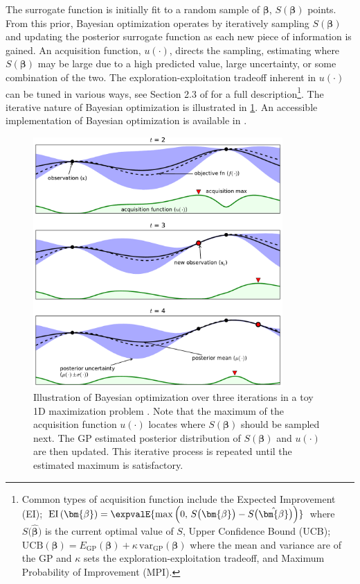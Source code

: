 The surrogate function is initially fit to
a random sample of $\bm{\beta}$, $S\left(\bm{\beta}\right)$ points.
From this prior, Bayesian optimization
operates by iteratively sampling $S\left(\bm{\beta}\right)$ and updating
the posterior surrogate function as each new piece of information is gained.
An acquisition function, $u\left(\cdot\right)$, directs the sampling,
estimating where $S\left(\bm{\beta}\right)$ may be large
due to a high predicted value, large uncertainty, or some combination of the two.
The exploration-exploitation tradeoff inherent in $u\left(\cdot\right)$
can be tuned in various ways, see Section 2.3 of \cite{Brochu2010} for a full description\footnote{Common types of acquisition function include the
Expected Improvement (EI);
$\text{EI}\left(\bm{\beta}\right) = \expvalE{\max\left(0,\,S\big(\bm{\beta}\big) - S\big(\hat{\bm{\beta}}\big)\right)}$
where $S\big(\hat{\bm{\beta}}\big)$ is the current optimal value of $S$,
Upper Confidence Bound (UCB);
$\text{UCB}\left(\bm{\beta}\right) = E_{\text{GP}} \left(\bm{\beta}\right) + \kappa\,\text{var}_{\text{GP}} \left(\bm{\beta}\right)$ where the mean and variance are of the GP and $\kappa$ sets the exploration-exploitation tradeoff,
and Maximum Probability of Improvement (MPI).}.
The iterative nature of Bayesian optimization is illustrated in \cref{fig:additional:unsupervised:BO:BO_ex}.
An accessible implementation of Bayesian optimization is available in \skopt \cite{scikit-optimize,Borisyak}.

\begin{figure}[H] %
\centering
\includegraphics[width=0.85\textwidth]{figures/ml/toyGPtext3}
\caption{
Illustration of Bayesian optimization over three iterations in a toy 1D maximization problem \cite{Brochu2010}.
Note that the maximum of the acquisition function $u\left(\cdot\right)$
locates where $S\left(\bm{\beta}\right)$ should be sampled next.
The GP estimated posterior distribution of $S\left(\bm{\beta}\right)$
and $u\left(\cdot\right)$ are then updated.
This iterative process is repeated until the estimated maximum is satisfactory.
}
\label{fig:additional:unsupervised:BO:BO_ex}
\end{figure}


